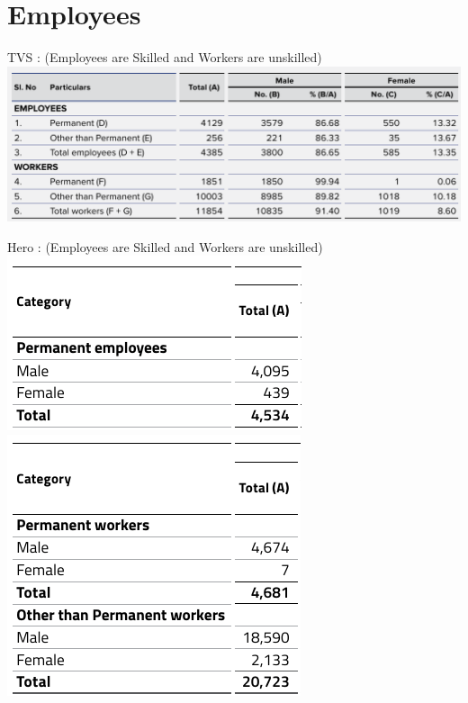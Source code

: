 \section{Employees}
TVS : (Employees are Skilled and Workers are unskilled) \\
\includegraphics[width=\linewidth]{psycho_images/TVS_employee.png}

\newpage

Hero : (Employees are Skilled and Workers are unskilled) \\
\includegraphics[width=0.5\linewidth]{psycho_images/Hero_employee_0.png}
\includegraphics[width=0.5\linewidth]{psycho_images/Hero_employee_1.png}